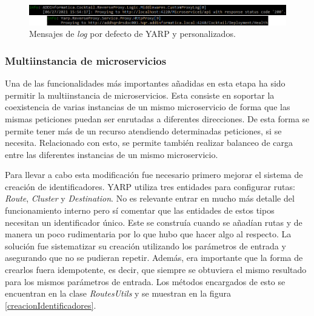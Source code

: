 \documentclass[11pt,spanish,listoffigures]{tfgetsinf}
\begin{document}
\begin{figure}[ht]
\centering
\includegraphics[width=1\textwidth]{imagenes/logs}
\caption{Mensajes de \emph{log} por defecto de YARP y personalizados.}
	\label{logs}
\end{figure}


			\subsubsection{Multiinstancia de microservicios}

Una de las funcionalidades más importantes añadidas en esta etapa ha sido permitir la multiinstancia de microservicios. Esta consiste en soportar la coexistencia de varias instancias de un mismo microservicio de forma que las mismas peticiones puedan ser enrutadas a diferentes direcciones. De esta forma se permite tener más de un recurso atendiendo determinadas peticiones, si se necesita. Relacionado con esto, se permite también realizar balanceo de carga entre las diferentes instancias de un mismo microservicio.

Para llevar a cabo esta modificación fue necesario primero mejorar el sistema de creación de identificadores. YARP utiliza tres entidades para configurar rutas: \emph{Route}, \emph{Cluster} y \emph{Destination}. No es relevante entrar en mucho más detalle del funcionamiento interno pero sí comentar que las entidades de estos tipos necesitan un identificador único. Este se construía cuando se añadían rutas y de manera un poco rudimentaria por lo que hubo que hacer algo al respecto. La solución fue sistematizar su creación utilizando los parámetros de entrada y asegurando que no se pudieran repetir. Además, era importante que la forma de crearlos fuera idempotente, es decir, que siempre se obtuviera el mismo resultado para los mismos parámetros de entrada. Los métodos encargados de esto se encuentran en la clase \emph{RoutesUtils} y se muestran en la figura \ref{creacionIdentificadores}.
\end{document}

